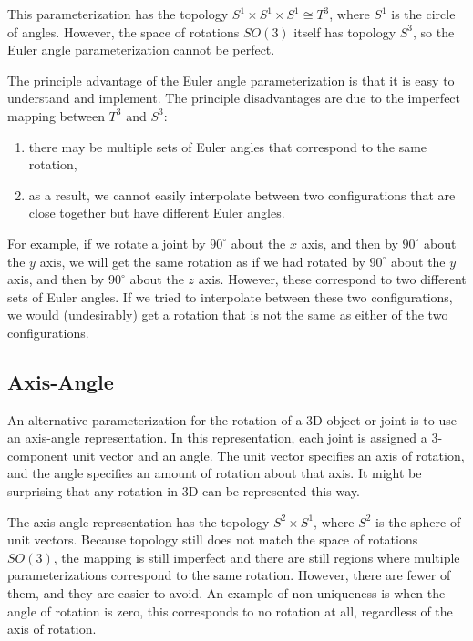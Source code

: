 This parameterization has the topology $S^1 \times S^1 \times S^1 ≅ T^3$, where $S^1$ is the circle of angles. However, the space of rotations $SO(3)$ itself has topology $S^3$, so the Euler angle parameterization cannot be perfect. 

The principle advantage of the Euler angle parameterization is that it is easy to understand and implement. The principle disadvantages are due to the imperfect mapping between $T^3$ and $S^3$:
\begin{enumerate}
    \item there may be multiple sets of Euler angles that correspond to the same rotation,
    \item as a result, we cannot easily interpolate between two configurations that are close together but have different Euler angles.
\end{enumerate}

For example, if we rotate a joint by $90^\circ$ about the $x$ axis, and then by $90^\circ$ about the $y$ axis, we will get the same rotation as if we had rotated by $90^\circ$ about the $y$ axis, and then by $90^\circ$ about the $z$ axis. However, these correspond to two different sets of Euler angles. If we tried to interpolate between these two configurations, we would (undesirably) get a rotation that is not the same as either of the two configurations.

\subsection{Axis-Angle}

An alternative parameterization for the rotation of a 3D object or joint is to use an axis-angle representation. In this representation, each joint is assigned a 3-component unit vector and an angle. The unit vector specifies an axis of rotation, and the angle specifies an amount of rotation about that axis. It might be surprising that any rotation in 3D can be represented this way.

The axis-angle representation has the topology $S^2 \times S^1$, where $S^2$ is the sphere of unit vectors. Because topology still does not match the space of rotations $SO(3)$, the mapping is still imperfect and there are still regions where multiple parameterizations correspond to the same rotation. However, there are fewer of them, and they are easier to avoid. An example of non-uniqueness is when the angle of rotation is zero, this corresponds to no rotation at all, regardless of the axis of rotation.


